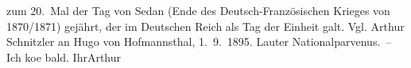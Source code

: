 \begin{ledgroupsized}[t]{13cm}
{{{                  zum 20. Mal der Tag von Sedan (Ende des Deutsch-Französischen Krieges von 1870/1871) gejährt,
                  der im Deutschen Reich als Tag der Einheit
                  galt. Vgl. Arthur Schnitzler an Hugo von Hofmannsthal, 1. 9. 1895}}}\label{K_L00041-1h}. Lauter Nationalparvenus. – Ich ko{\geminationm}e bald.
                  Ihr\spacefill\mbox{Arthur}\pend
           
         
         \endnumbering{}\end{ledgroupsized}  \newcommand{\dateiname}{L00041}\newcommand{\titel}{Arthur Schnitzler an Richard Beer-Hofmann, 22. 9. 1891}\newcommand{\editorInnen}{Martin Anton Müller und Gerd-Hermann Susen}
      